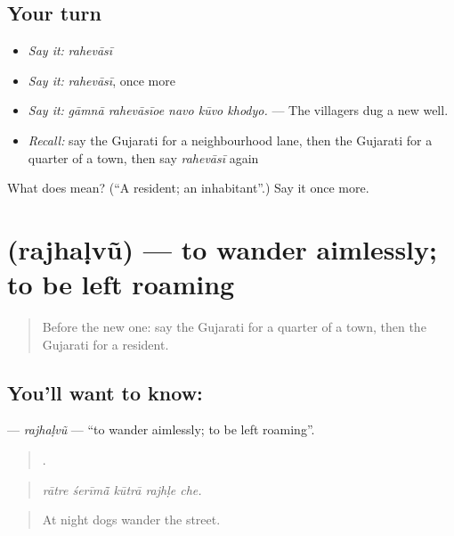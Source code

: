 \subsection*{Your turn}
\begin{itemize}
\raggedright
  \item \emph{Say it:} \emph{rahevāsī}
  \item \emph{Say it:} \emph{rahevāsī}, once more
  \item \emph{Say it:} \emph{gāmnā rahevāsīoe navo kūvo khodyo.} — The villagers dug a new well.
  \item \emph{Recall:} say the Gujarati for a neighbourhood lane, then the Gujarati for a quarter of a town, then say \emph{rahevāsī} again
\end{itemize}

\begin{tcolorbox}[breakable,colback=teal!4,colframe=teal!35!black,title={Before you move on}]
What does  mean? (\textquotedblleft{}A resident; an inhabitant\textquotedblright{}.) Say it once more.
\end{tcolorbox}
\section[\texorpdfstring{\gu{રઝળવું} (rajhaḷvũ)}{રઝળવું (rajhaḷvũ)}]{ (rajhaḷvũ) — to wander aimlessly; to be left roaming}

\label{lesson:GU-C419-rajhalvu}



\begin{quote}
Before the new one: say the Gujarati for a quarter of a town, then the Gujarati for a resident.
\end{quote}

\subsection*{You'll want to know: }
\textbf{} — \emph{rajhaḷvũ} — \textquotedblleft{}to wander aimlessly; to be left roaming\textquotedblright{}.

\begin{quote}
    .
\end{quote}

\begin{quote}
\emph{rātre śerīmā̃ kūtrā rajhḷe che.}
\end{quote}

\begin{quote}
At night dogs wander the street.
\end{quote}

